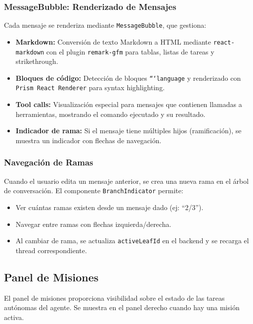 \subsubsection{MessageBubble: Renderizado de Mensajes}

Cada mensaje se renderiza mediante \texttt{MessageBubble}, que gestiona:

\begin{itemize}
    \item \textbf{Markdown:} Conversión de texto Markdown a HTML mediante \texttt{react-markdown} con el plugin \texttt{remark-gfm} para tablas, listas de tareas y strikethrough.
    \item \textbf{Bloques de código:} Detección de bloques \texttt{```language} y renderizado con \texttt{Prism React Renderer} para syntax highlighting.
    \item \textbf{Tool calls:} Visualización especial para mensajes que contienen llamadas a herramientas, mostrando el comando ejecutado y su resultado.
    \item \textbf{Indicador de rama:} Si el mensaje tiene múltiples hijos (ramificación), se muestra un indicador con flechas de navegación.
\end{itemize}

\subsubsection{Navegación de Ramas}

Cuando el usuario edita un mensaje anterior, se crea una nueva rama en el árbol de conversación. El componente \texttt{BranchIndicator} permite:

\begin{itemize}
    \item Ver cuántas ramas existen desde un mensaje dado (ej: ``2/3'').
    \item Navegar entre ramas con flechas izquierda/derecha.
    \item Al cambiar de rama, se actualiza \texttt{activeLeafId} en el backend y se recarga el thread correspondiente.
\end{itemize}

\subsection{Panel de Misiones}

El panel de misiones proporciona visibilidad sobre el estado de las tareas autónomas del agente. Se muestra en el panel derecho cuando hay una misión activa.

